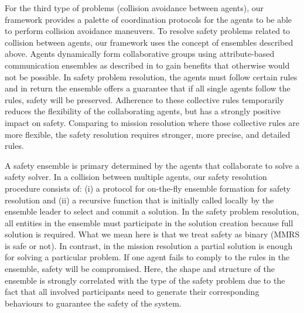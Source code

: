 \documentclass[journal]{IEEEtran}
\theoremstyle{definition}
\newcommand{\ugh}[1]{\textcolor{red}{\uwave{#1}}} %
\newcommand\patrizio[1]{\nb{Patrizio}{#1}}
\newcommand\todo[1]{\nb{Todo}{#1}}
\begin{document}
For the third type of problems (collision avoidance between agents), our framework provides a palette of coordination protocols for the agents to be able to perform collision avoidance maneuvers. 
To resolve safety problems related to collision between agents, our framework uses the concept of ensembles described above.
Agents dynamically form collaborative groups using attribute-based communication ensembles as described in \todo{[reference needed]} to gain benefits that otherwise
would not be possible. In safety problem resolution, the agents must follow certain rules and in return the ensemble offers a guarantee that if all single agents follow the rules, safety will be preserved. Adherence to these collective
rules temporarily reduces the flexibility of the collaborating agents, but has a strongly positive impact on safety. Comparing to mission resolution where those collective rules are more flexible, the safety resolution requires stronger, more precise, and detailed rules. 


A safety ensemble is primary determined by the agents that collaborate to solve a safety solver. In a collision between multiple agents, our safety resolution procedure consists of: (i) a protocol for on-the-fly ensemble formation for safety resolution and (ii) a recursive function that is initially called locally by the ensemble leader to select and commit a solution. In the safety problem resolution, all entities in the ensemble must  participate in the solution creation because full solution is required. What we mean here is that we treat safety as binary (MMRS is safe or not). In contrast, in the mission resolution a partial solution is enough for solving a particular problem.
If one agent fails to comply to the rules in the ensemble, safety will be compromised. Here, the shape and structure of the ensemble is strongly correlated with the type of the safety problem due to the fact that all involved participants need to generate their corresponding behaviours to guarantee the safety of the system.
\end{document}
